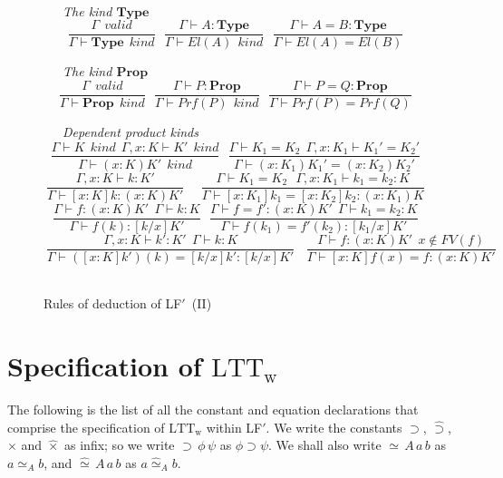 \documentclass[acmtocl]{acmtrans2m}
\newcommand{\LTTW}{\ensuremath{\mathrm{LTT}_\mathrm{w}}}
\newcommand{\Type}{\mathbf{Type}}
\newcommand{\Prop}{\mathbf{Prop}}
\newcommand{\Prf}[1]{Prf \left( {#1} \right)}
\newcommand{\LF}{LF$'$}
\begin{document}
\begin{figure}\begin{minipage}{\linewidth}
\ \\

\ \ \ \emph{The kind $\Type$}
$$
\frac{\Gamma \: \: valid}{\Gamma \vdash \Type\: \: kind}\: \: \:
\frac{\Gamma \vdash A\colon \Type}{\Gamma \vdash El(A)\: \: kind}\:
\: \: \frac{\Gamma \vdash A=B\colon \Type}{\Gamma \vdash
El(A)=El(B)}$$

\ \ \ \emph{The kind $\Prop$}
$$
\frac{\Gamma \: \: valid}{\Gamma \vdash \Prop\: \: kind}\: \: \:
\frac{\Gamma \vdash P\colon \Prop}{\Gamma \vdash \Prf{P}\: \:
kind}\: \: \: \frac{\Gamma \vdash P=Q\colon \Prop}{\Gamma \vdash
\Prf{P}=\Prf{Q}}$$

\ \ \ \emph{Dependent product kinds}
$$
\frac{\Gamma \vdash K\: \: kind\: \: \Gamma ,x:K\vdash K'\: \:
kind}{\Gamma \vdash (x:K)K'\: \: kind}\: \: \: \frac{\Gamma \vdash
K_{1}=K_{2}\: \: \Gamma ,x:K_{1}\vdash K_{1}'=K_{2}'}{\Gamma \vdash
(x:K_{1})K_{1}'=(x:K_{2})K_{2}'}$$
$$
\frac{\Gamma ,x:K\vdash k\colon K'}{\Gamma \vdash [x:K]k\colon
(x:K)K'}\: \: \: \: \: \: \frac{\Gamma \vdash K_{1}=K_{2}\: \: \:
\Gamma ,x:K_{1}\vdash k_{1}=k_{2}\colon K}{\Gamma \vdash
[x:K_{1}]k_{1}=[x:K_{2}]k_{2}\colon (x:K_{1})K}$$
$$
\frac{\Gamma \vdash f\colon (x:K)K'\: \: \Gamma \vdash k\colon
K}{\Gamma \vdash f(k)\colon [k/x]K'}\: \: \: \frac{\Gamma \vdash
f=f'\colon (x:K)K'\: \: \Gamma \vdash k_{1}=k_{2}\colon K}{\Gamma
\vdash f(k_{1})=f'(k_{2})\colon [k_{1}/x]K'}$$
$$
\: \frac{\Gamma ,x:K\vdash k'\colon K'\: \: \Gamma \vdash k\colon
K}{\Gamma \vdash ([x:K]k')(k)=[k/x]k'\colon [k/x]K'}\: \: \: \:
\frac{\Gamma \vdash f\colon (x:K)K'\: \: x\notin FV(f)}{\Gamma
\vdash [x:K]f(x)=f\colon (x:K)K'}$$
\\
\end{minipage}
\caption{Rules of deduction of \LF\ (II)} \label{LF-rulesSpec}
\end{figure}
 \section{Specification of $\LTTW$}
\label{appendix:lttw}

The following is the list of all the constant and equation
declarations that comprise the specification of $\LTTW$ within \LF.
We write the constants $\supset$, $\hat{\supset}$, $\times$ and
$\hat{\times}$ as infix; so we write $\supset \, \phi \, \psi$ as
$\phi \supset \psi$.  We shall also write $\simeq \, A \, a \, b$ as
$a \simeq_A b$, and $\hat{\simeq} \, A \, a \, b$ as $a
\hat{\simeq}_A b$.
\end{document}
